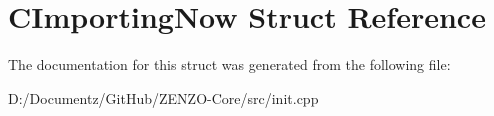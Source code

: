 \hypertarget{struct_c_importing_now}{}\section{C\+Importing\+Now Struct Reference}
\label{struct_c_importing_now}


The documentation for this struct was generated from the following file\+:\begin{DoxyCompactItemize}
\item 
D\+:/\+Documentz/\+Git\+Hub/\+Z\+E\+N\+Z\+O-\/\+Core/src/init.\+cpp\end{DoxyCompactItemize}
